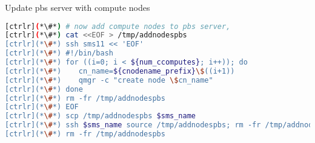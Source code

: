 Update pbs server with compute nodes

\begin{lstlisting}[language=bash,keywords={}]
[ctrlr](*\#*) # now add compute nodes to pbs server, 
[ctrlr](*\#*) cat <<EOF > /tmp/addnodespbs
[ctrlr](*\#*) ssh sms11 << 'EOF'
[ctrlr](*\#*) #!/bin/bash
[ctrlr](*\#*) for ((i=0; i < ${num_ccomputes}; i++)); do
[ctrlr](*\#*)    cn_name=${cnodename_prefix}\$((i+1))
[ctrlr](*\#*)    qmgr -c "create node \$cn_name"
[ctrlr](*\#*) done
[ctrlr](*\#*) rm -fr /tmp/addnodespbs
[ctrlr](*\#*) EOF
[ctrlr](*\#*) scp /tmp/addnodespbs $sms_name
[ctrlr](*\#*) ssh $sms_name source /tmp/addnodespbs; rm -fr /tmp/addnodespbs;
[ctrlr](*\#*) rm -fr /tmp/addnodespbs

\end{lstlisting}
